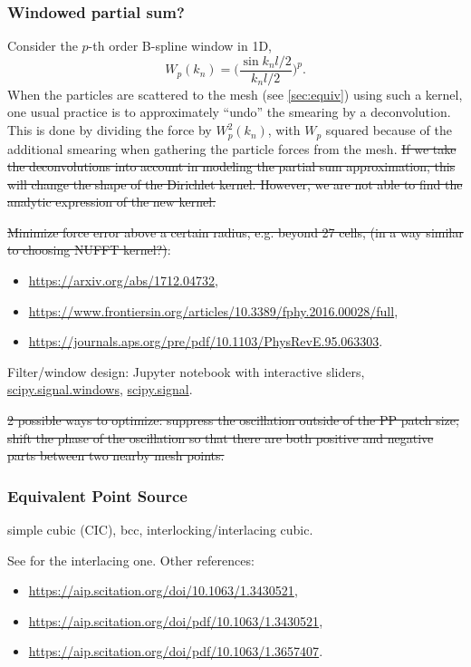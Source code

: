 \documentclass[a4paper]{article}
\newcommand{\1}{\mathds{1}}
\newcommand{\YL}[1]{\textcolor{Bittersweet}{#1}}
\begin{document}
\subsubsection{Windowed partial sum?}

Consider the $p$-th order B-spline window in 1D,
%
\begin{equation}
W_p(k_n) = \biggl( \frac{\sin k_n l / 2}{k_n l / 2} \biggr)^p.
\end{equation}
%
When the particles are scattered to the mesh (see \autoref{sec:equiv})
using such a kernel, one usual practice is to approximately ``undo'' the
smearing by a deconvolution.
This is done by dividing the force by $W_p^2(k_n)$, with $W_p$ squared
because of the additional smearing when gathering the particle forces
from the mesh.
\st{
If we take the deconvolutions into account in modeling the partial sum
approximation, this will change the shape of the Dirichlet kernel.
However, we are not able to find the analytic expression of the new
kernel.
}


\YL{\st{Minimize force error above a certain radius, e.g. beyond 27 cells,
(in a way similar to choosing NUFFT kernel?)}:
\begin{itemize}
\item \url{https://arxiv.org/abs/1712.04732},
\item \url{https://www.frontiersin.org/articles/10.3389/fphy.2016.00028/full},
\item \url{https://journals.aps.org/pre/pdf/10.1103/PhysRevE.95.063303}.
\end{itemize}
}


\YL{Filter/window design: Jupyter notebook with interactive sliders,
\href{https://docs.scipy.org/doc/scipy/reference/signal.windows.html}{scipy.signal.windows},
\href{https://docs.scipy.org/doc/scipy/reference/signal.html}{scipy.signal}.
}


\YL{\st{2 possible ways to optimize:
suppress the oscillation outside of the PP patch size;
shift the phase of the oscillation so that there are both positive and
negative parts between two nearby mesh points.}
}


\subsubsection{Equivalent Point Source}
\label{sec:equiv}

simple cubic (CIC), bcc, interlocking/interlacing cubic.
\YL{See \cite{HockneyEastwood1988} for the interlacing one.
Other references:
\begin{itemize}
\item \url{https://aip.scitation.org/doi/10.1063/1.3430521},
\item \url{https://aip.scitation.org/doi/pdf/10.1063/1.3430521},
\item \url{https://aip.scitation.org/doi/pdf/10.1063/1.3657407}.
\end{itemize}
}
\end{document}
